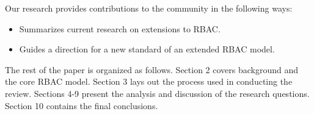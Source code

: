 Our research provides contributions to the community in the following ways:

\begin{itemize}
\setlength{\itemsep}{0.25pt}
\item Summarizes current research on extensions to RBAC.
\item Guides a direction for a new standard of an extended RBAC model.
\end{itemize}

The rest of the paper is organized as follows.  Section 2 covers background and the core RBAC model. Section 3 lays out the process used in conducting the review. Sections 4-9 present the analysis and discussion of the research questions. Section 10 contains the final conclusions.
